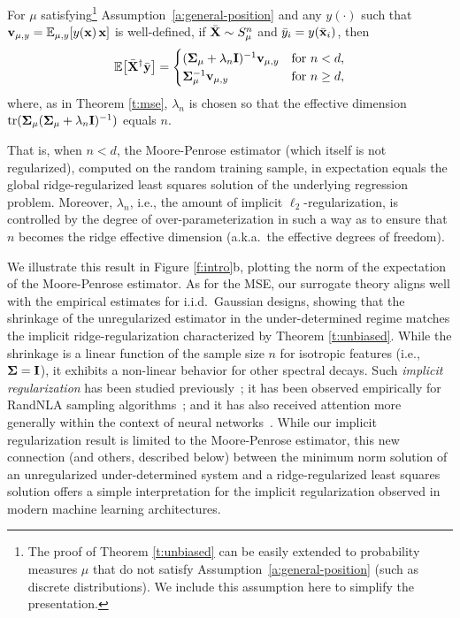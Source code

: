 \documentclass[11pt]{article}
\begin{document}
\begin{theorem}
\label{t:unbiased}
For $\mu$ satisfying\footnote{The proof of Theorem \ref{t:unbiased}
  can be easily extended to probability measures $\mu$ that do not
  satisfy Assumption~\ref{a:general-position} (such as discrete distributions). We include this
  assumption here to simplify the presentation.} Assumption~\ref{a:general-position} and any
  $y(\cdot)$ such that   $\mathbf v_{\mu,y}=\mathbb E_{\mu,y}[y(\mathbf x)\,\mathbf x]$ is well-defined, if
  ${\bar{\mathbf X}}\sim S_\mu^n$ and ${\bar y}_i=y(\bar{\mathbf x}_i)$, then
  \begin{align*}
    \mathbb E\big[{\bar{\mathbf X}}^\dagger\bar{\mathbf y}\big] = 
    \begin{cases}
       (\mathbf{\Sigma}_\mu + \lambda_n\mathbf I)^{-1}\mathbf v_{\mu,y} &\text{for }n<d,\\
        \mathbf{\Sigma}_\mu^{-1}\mathbf v_{\mu,y} &\text{for }n \ge d,
    \end{cases}
  \end{align*}
  where, as in Theorem \ref{t:mse}, $\lambda_n$ is chosen so that the effective dimension
  $\mathrm{tr}(\mathbf{\Sigma}_\mu(\mathbf{\Sigma}_\mu+\lambda_n\mathbf I)^{-1})$ equals $n$.
\end{theorem}

\noindent
That is, when $n < d$, the Moore-Penrose estimator (which itself is
not regularized), computed on the
random training sample, in expectation equals the global ridge-regularized least
squares solution of the underlying regression
problem. Moreover, $\lambda_n$, i.e., the amount
of implicit $\ell_2$-regularization, is controlled by the degree of
over-parameterization in such a way as to ensure that $n$ becomes the ridge effective dimension
(a.k.a.~the effective degrees of freedom). 

We illustrate this result in Figure
\ref{f:intro}b, plotting the norm of the expectation of the
Moore-Penrose estimator. As for the MSE, our surrogate theory aligns
well with the empirical estimates for i.i.d.~Gaussian designs, showing
that the shrinkage of the unregularized estimator in the
under-determined regime matches the implicit
ridge-regularization characterized by Theorem \ref{t:unbiased}. While the shrinkage
is a linear function of the sample size $n$ for isotropic features
(i.e., $\mathbf{\Sigma}=\mathbf I$), it 
exhibits a non-linear behavior for other spectral decays.
Such \emph{implicit regularization} has been studied
previously~\cite{MO11-implementing, PM11, GM14_ICML, Mah12}; it has
been observed empirically for RandNLA sampling
algorithms~\cite{Mah-mat-rev_JRNL, MMY15}; and it has also received attention more
generally within the context of neural networks~\cite{Ney17_TR}. While our implicit regularization result
is limited to the Moore-Penrose estimator, this new connection (and
others, described below) between the minimum norm solution of an unregularized
under-determined system and a ridge-regularized least squares solution
offers a simple interpretation for the implicit regularization
observed in modern machine learning architectures. 
\end{document}
